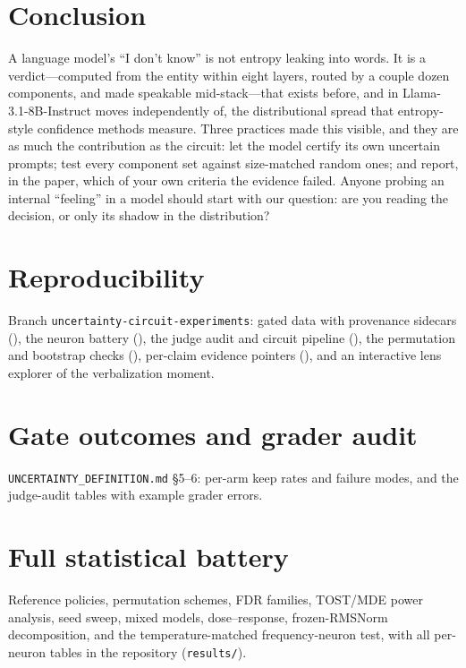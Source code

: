 \documentclass{article}
\newcommand{\lm}{Llama-3.1-8B-Instruct}
\begin{document}
\section{Conclusion}
A language model's ``I don't know'' is not entropy leaking into words. It is a verdict---computed from the
entity within eight layers, routed by a couple dozen components, and made speakable mid-stack---that exists
before, and in \lm{} moves independently of, the distributional spread that entropy-style confidence
methods measure. Three
practices made this visible, and they are as much the contribution as the circuit: let the model certify
its own uncertain prompts; test every component set against size-matched random ones; and report, in the
paper, which of your own criteria the evidence failed. Anyone probing an internal ``feeling'' in a model
should start with our question: are you reading the decision, or only its shadow in the distribution?

\section*{Reproducibility}
\begingroup\sloppy
Branch \texttt{uncertainty-circuit-experiments}: gated data with provenance sidecars (), the neuron
battery (), the judge audit and circuit pipeline
(), the permutation and bootstrap checks
(), per-claim evidence pointers (), and an
interactive lens explorer of the verbalization moment.
\endgroup




\appendix
\section{Gate outcomes and grader audit}
\texttt{UNCERTAINTY\_DEFINITION.md} \S5--6: per-arm keep rates and failure modes, and the judge-audit
tables with example grader errors.

\section{Full statistical battery}
Reference policies, permutation schemes, FDR families, TOST/MDE power analysis, seed sweep, mixed models,
dose--response, frozen-RMSNorm decomposition, and the temperature-matched frequency-neuron test, with all
per-neuron tables in the repository (\texttt{results/}).
\end{document}
